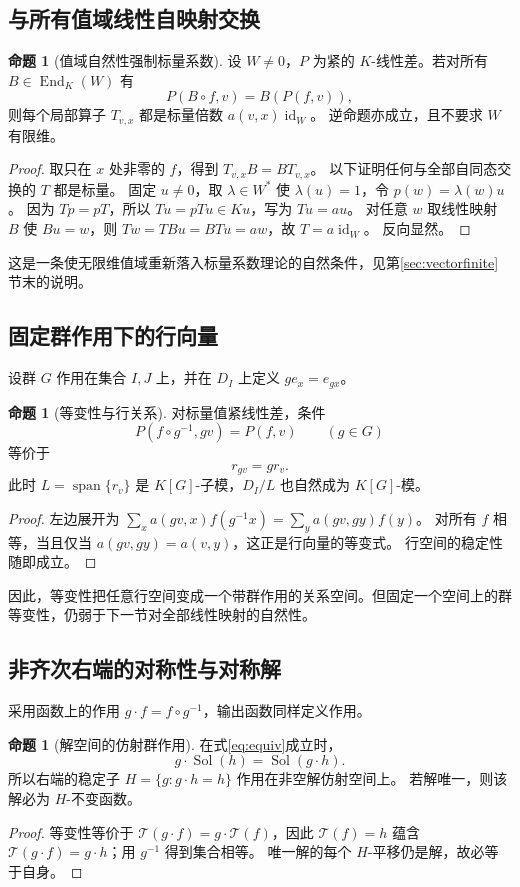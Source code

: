 \documentclass[UTF8,11pt,a4paper]{ctexart}
\theoremstyle{definition}
\newtheorem{proposition}[theorem]{命题}
\newcommand{\End}{\operatorname{End}}
\newcommand{\Span}{\operatorname{span}}
\newcommand{\id}{\operatorname{id}}
\newcommand{\T}{\mathcal T}
\newcommand{\Sol}{\operatorname{Sol}}
\begin{document}
\subsection{与所有值域线性自映射交换}
\begin{proposition}[值域自然性强制标量系数]\label{prop:commutant}
设 $W\ne0$，$P$ 为紧的 $K$-线性差。若对所有 $B\in\End_K(W)$ 有
\[
 P(B\circ f,v)=B(P(f,v)),
\]
则每个局部算子 $T_{v,x}$ 都是标量倍数 $a(v,x)\id_W$。
逆命题亦成立，且不要求 $W$ 有限维。
\end{proposition}
\begin{proof}
取只在 $x$ 处非零的 $f$，得到 $T_{v,x}B=BT_{v,x}$。
以下证明任何与全部自同态交换的 $T$ 都是标量。
固定 $u\ne0$，取 $\lambda\in W^*$ 使 $\lambda(u)=1$，令 $p(w)=\lambda(w)u$。
因为 $Tp=pT$，所以 $Tu=pTu\in Ku$，写为 $Tu=au$。
对任意 $w$ 取线性映射 $B$ 使 $Bu=w$，则 $Tw=TBu=BTu=aw$，故 $T=a\id_W$。
反向显然。
\end{proof}
这是一条使无限维值域重新落入标量系数理论的自然条件，见第\ref{sec:vectorfinite}节末的说明。

\subsection{固定群作用下的行向量}
设群 $G$ 作用在集合 $I,J$ 上，并在 $D_I$ 上定义 $g e_x=e_{gx}$。
\begin{proposition}[等变性与行关系]
对标量值紧线性差，条件
\begin{equation}\label{eq:equiv}
 P(f\circ g^{-1},gv)=P(f,v)\qquad(g\in G)
\end{equation}
等价于
\[
 r_{gv}=g r_v.
\]
此时 $L=\Span\{r_v\}$ 是 $K[G]$-子模，$D_I/L$ 也自然成为 $K[G]$-模。
\end{proposition}
\begin{proof}
左边展开为 $\sum_xa(gv,x)f(g^{-1}x)=\sum_ya(gv,gy)f(y)$。
对所有 $f$ 相等，当且仅当 $a(gv,gy)=a(v,y)$，这正是行向量的等变式。
行空间的稳定性随即成立。
\end{proof}
因此，等变性把任意行空间变成一个带群作用的关系空间。但固定一个空间上的群等变性，仍弱于下一节对全部线性映射的自然性。

\subsection{非齐次右端的对称性与对称解}
采用函数上的作用 $g\cdot f=f\circ g^{-1}$，输出函数同样定义作用。
\begin{proposition}[解空间的仿射群作用]\label{prop:affinesolutions}
在式\eqref{eq:equiv}成立时，
\[
 g\cdot\Sol(h)=\Sol(g\cdot h).
\]
所以右端的稳定子 $H=\{g:g\cdot h=h\}$ 作用在非空解仿射空间上。
若解唯一，则该解必为 $H$-不变函数。
\end{proposition}
\begin{proof}
等变性等价于 $\T(g\cdot f)=g\cdot\T(f)$，因此 $\T(f)=h$ 蕴含 $\T(g\cdot f)=g\cdot h$；用 $g^{-1}$ 得到集合相等。
唯一解的每个 $H$-平移仍是解，故必等于自身。
\end{proof}
\end{document}
